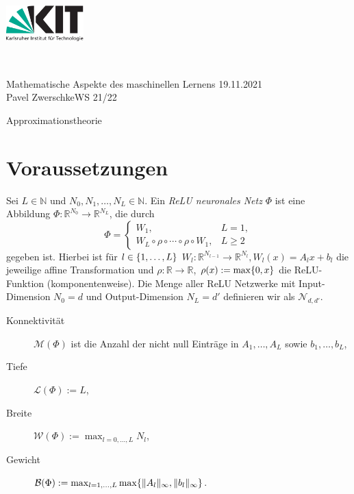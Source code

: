 \documentclass[11pt]{scrartcl}
\def\Semester{WS 21/22}
\def\Seminar{Mathematische Aspekte des maschinellen Lernens}
\def\Title{Approximationstheorie}
\def\Author{Pavel Zwerschke}
\def\Date{19.11.2021} %
\newcommand{\N}{\mathbb{N}} %
\newcommand{\R}{\mathbb{R}} %
\newcommand{\norm}[1]{\| #1 \|}
\begin{document}
\vspace*{-2cm}
\begin{minipage}{3cm}
    \includegraphics[width=3cm]{./logos/kit-de.pdf} %
\end{minipage}\hspace*{0.2cm}~
\begin{minipage}{14cm}{
        \sffamily \Large{\Seminar} \hfill \Date \\ 
        \Author \hfill \Semester
}\end{minipage}
\vspace{-0.5cm}
\begin{center}
    \huge \sffamily \Title
\end{center}
\vspace{-1cm}

\section{Voraussetzungen}
\label{sec:prerequisites}

\begin{definition}
    Sei \(L \in \N\) und \(N_0, N_1, \ldots, N_L \in \N\). Ein 
    \textit{ReLU neuronales Netz} \(\Phi\) ist eine Abbildung 
    \(\Phi: \R^{N_0} \rightarrow \R^{N_L}\), die durch 
    \[ \Phi = \begin{cases}
        W_1, & L = 1, \\
        W_L \circ \rho \circ \cdots \circ \rho \circ W_1, & L \geq 2
    \end{cases} \]
    gegeben ist. Hierbei ist für \(l\in \{1,\ldots, L\}\) \(W_l : \R^{N_{l-1}} \rightarrow \R^{N_l}, W_l(x) = A_l x + b_l\) 
    die jeweilige affine Transformation und \(\rho: \R \rightarrow \R\), \(\rho(x) := \max\{0, x\}\) 
    die ReLU-Funktion (komponentenweise).
    Die Menge aller ReLU Netzwerke mit Input-Dimension \(N_0 = d\) und Output-Dimension \(N_L = d'\) 
    definieren wir als \(\mathcal{N}_{d,d'}\).
\end{definition}

\begin{definition}\leavevmode
    \begin{description}
        \item[Konnektivität] \(\mathcal{M}(\Phi)\) ist die Anzahl der nicht null Einträge in \(A_1, \ldots, A_L\) 
        sowie \(b_1, \ldots, b_L\),
        \item[Tiefe] \(\mathcal{L}(\Phi) := L\),
        \item[Breite] \(\mathcal{W}(\Phi) := \max_{l=0,\ldots, L} N_l\),
        \item[Gewicht] \(\mathcal{B}(\Phi) := \max_{l=1,\ldots, L} \max\set{\norm{A_l}_\infty, \norm{b_l}_\infty}\).
    \end{description}
\end{definition}
\end{document}
